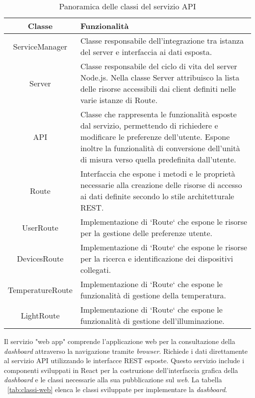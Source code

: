 \begin{table}[!h]
\caption{Panoramica delle classi del servizio API}
\label{tab:classi-api}
\begin{tabularx}{\linewidth}{|c|X|}
\hline
\textbf{Classe} & \textbf{Funzionalità} \\
\hline
ServiceManager & Classe responsabile dell'integrazione tra istanza del server e interfaccia ai dati esposta. \\
\hline
Server & Classe responsabile del ciclo di vita del server Node.js. Nella classe Server attribuisco la lista delle risorse accessibili dai client definiti nelle varie istanze di Route. \\
\hline
API & Classe che rappresenta le funzionalità esposte dal servizio, permettendo di richiedere e modificare le preferenze dell'utente. Espone inoltre la funzionalità di conversione dell'unità di misura verso quella predefinita dall'utente. \\
\hline
Route & Interfaccia che espone i metodi e le proprietà necessarie alla creazione delle risorse di accesso ai dati definite secondo lo stile architetturale REST. \\
\hline
UserRoute & Implementazione di `Route` che espone le risorse per la gestione delle preferenze utente. \\
\hline
DevicesRoute & Implementazione di `Route` che espone le risorse per la ricerca e identificazione dei dispositivi collegati. \\
\hline
TemperatureRoute & Implementazione di `Route` che espone le funzionalità di gestione della temperatura. \\
\hline
LightRoute & Implementazione di `Route` che espone le funzionalità di gestione dell'illuminazione. \\
\hline
\end{tabularx}
\end{table}


Il servizio "web app" comprende l'applicazione web per la consultazione della \emph{dashboard} attraverso la navigazione tramite \emph{browser}.
Richiede i dati direttamente al servizio API utilizzando le interfacce REST esposte.
Questo servizio include i componenti sviluppati in React per la costruzione dell'interfaccia grafica della \emph{dashboard} e le classi necessarie alla sua pubblicazione sul \emph{web}.
La tabella ~\ref{tab:classi-web} elenca le classi sviluppate per implementare la \emph{dashboard}.

